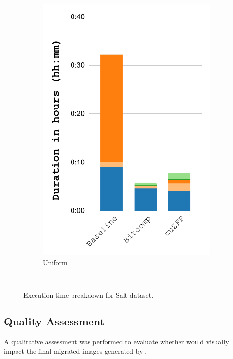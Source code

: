 \documentclass[Ingles,Final]{ic-tese-v3}
\begin{document}
\begin{figure}[h!]
\begin{subfigure}{0.3\textwidth}
        \includegraphics[width=\textwidth,trim={0 0 0 0},clip]{figures/compress_breakdown/breakdown_compress_salt_uniform.pdf}
        \caption{Uniform}
        \label{fig:compress_breakdown_uniform}
    \end{subfigure}\\
    \caption[Execution time breakdown (\compression)]{Execution time breakdown for Salt dataset.}
    \label{fig:compress_breakdown}
\end{figure}

\subsection{Quality Assessment}
\label{sec:quality}

A qualitative assessment was performed to evaluate whether \compression would visually impact the final migrated images generated by \awave. 
\end{document}
